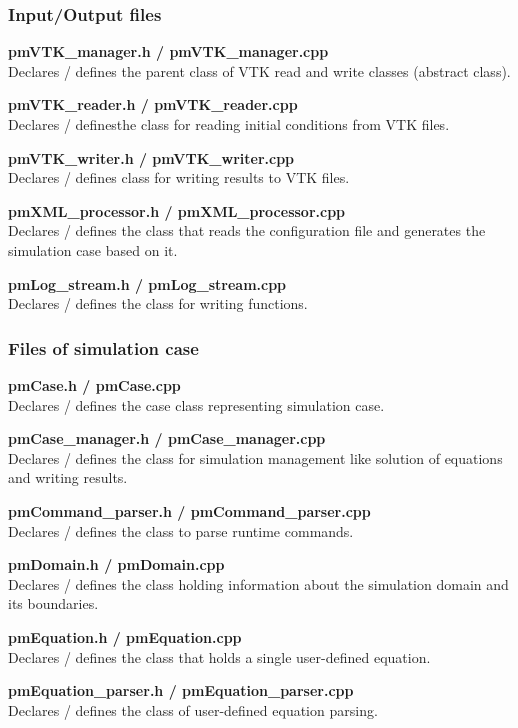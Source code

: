 \documentclass[a4paper,12pt,openany]{book}
\theoremstyle{break}
\begin{document}
\subsubsection{Input/Output files}

\textbf{pmVTK\_manager.h / pmVTK\_manager.cpp} \\
Declares / defines the parent class of VTK read and write classes (abstract class).

\textbf{pmVTK\_reader.h / pmVTK\_reader.cpp} \\
Declares / definesthe class for reading initial conditions from VTK files.

\textbf{pmVTK\_writer.h / pmVTK\_writer.cpp} \\
Declares / defines class for writing results to VTK files.

\textbf{pmXML\_processor.h / pmXML\_processor.cpp} \\
Declares / defines the class that reads the configuration file and generates the simulation case based on it.

\textbf{pmLog\_stream.h / pmLog\_stream.cpp} \\
Declares / defines the class for writing functions.


\subsubsection{Files of simulation case}

\textbf{pmCase.h / pmCase.cpp} \\
Declares / defines the case class representing  simulation case.

\textbf{pmCase\_manager.h / pmCase\_manager.cpp} \\
Declares / defines the class for simulation management like solution of equations and writing results.

\textbf{pmCommand\_parser.h / pmCommand\_parser.cpp} \\
Declares / defines the class to parse runtime commands.

\textbf{pmDomain.h / pmDomain.cpp} \\
Declares / defines the class holding information about the simulation domain and its boundaries.

\textbf{pmEquation.h / pmEquation.cpp} \\
Declares / defines the class that holds a single user-defined equation.

\textbf{pmEquation\_parser.h / pmEquation\_parser.cpp} \\
Declares / defines the class of user-defined equation parsing.
\end{document}
